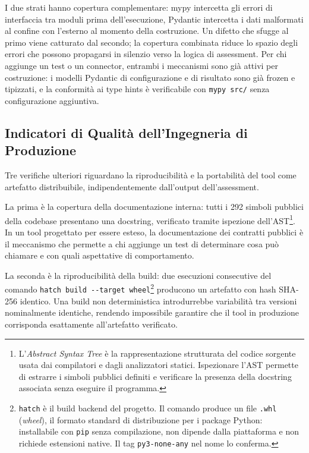 I due strati hanno copertura complementare: mypy intercetta gli errori di interfaccia tra moduli prima dell'esecuzione, Pydantic intercetta i dati malformati al confine con l'esterno al momento della costruzione. Un difetto che sfugge al primo viene catturato dal secondo; la copertura combinata riduce lo spazio degli errori che possono propagarsi in silenzio verso la logica di assessment. Per chi aggiunge un test o un connector, entrambi i meccanismi sono già attivi per costruzione: i modelli Pydantic di configurazione e di risultato sono già frozen e tipizzati, e la conformità ai type hints è verificabile con \texttt{mypy src/} senza configurazione aggiuntiva.


\subsection{Indicatori di Qualità dell'Ingegneria di Produzione}\label{subsec:production-quality}

Tre verifiche ulteriori riguardano la riproducibilità e la portabilità del tool come artefatto distribuibile, indipendentemente dall'output dell'assessment.

La prima è la copertura della documentazione interna: tutti i 292 simboli pubblici della codebase presentano una docstring, verificato tramite ispezione dell'\gls{AST}\footnote{L'\emph{Abstract Syntax Tree} è la rappresentazione strutturata del codice sorgente usata dai compilatori e dagli analizzatori statici. Ispezionare l'AST permette di estrarre i simboli pubblici definiti e verificare la presenza della docstring associata senza eseguire il programma.}. In un tool progettato per essere esteso, la documentazione dei contratti pubblici è il meccanismo che permette a chi aggiunge un test di determinare cosa può chiamare e con quali aspettative di comportamento.

La seconda è la riproducibilità della build: due esecuzioni consecutive del comando \texttt{hatch~build~-{}-target~wheel}\footnote{\texttt{hatch} è il build backend del progetto. Il comando produce un file \texttt{.whl} (\emph{wheel}), il formato standard di distribuzione per i package Python: installabile con \texttt{pip} senza compilazione, non dipende dalla piattaforma e non richiede estensioni native. Il tag \texttt{py3-none-any} nel nome lo conferma.} producono un artefatto con hash SHA-256 identico. Una build non deterministica introdurrebbe variabilità tra versioni nominalmente identiche, rendendo impossibile garantire che il tool in produzione corrisponda esattamente all'artefatto verificato.

